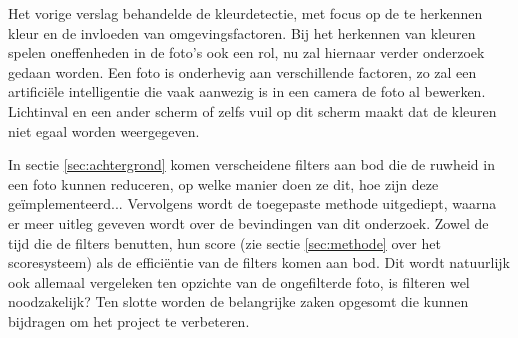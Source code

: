 Het vorige verslag behandelde de kleurdetectie, met focus op de te herkennen kleur en de invloeden van omgevingsfactoren. Bij het herkennen van kleuren spelen oneffenheden in de foto's ook een rol, nu zal hiernaar verder onderzoek gedaan worden. Een foto is onderhevig aan verschillende factoren, zo zal een artificiële intelligentie die vaak aanwezig is in een camera de foto al bewerken. Lichtinval en een ander scherm of zelfs vuil op dit scherm maakt dat de kleuren niet egaal worden weergegeven.

In sectie \ref{sec:achtergrond} komen verscheidene filters aan bod die de ruwheid in een foto kunnen reduceren, op welke manier doen ze dit, hoe zijn deze geïmplementeerd... Vervolgens wordt de toegepaste methode uitgediept, waarna er meer uitleg geveven wordt over de bevindingen van dit onderzoek. Zowel de tijd die de filters benutten, hun score (zie sectie \ref{sec:methode} over het scoresysteem) als de efficiëntie van de filters komen aan bod. Dit wordt natuurlijk ook allemaal vergeleken ten opzichte van de ongefilterde foto, is filteren wel noodzakelijk? Ten slotte worden de belangrijke zaken opgesomt die kunnen bijdragen om het project te verbeteren.